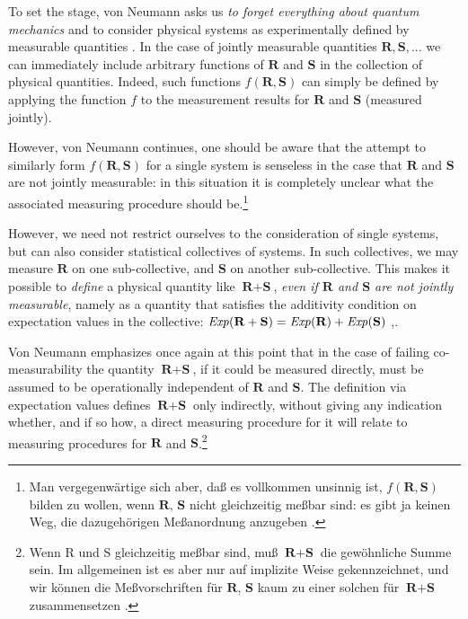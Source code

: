 \documentclass[12pt]{article}
\begin{document}
To set the stage, von Neumann asks us \emph{to forget everything about quantum mechanics} and to consider physical systems as experimentally defined by measurable quantities \cite[p.\@ 158]{VN1}. In the case of jointly measurable quantities $ \textbf{R}, \textbf{S},...$ we can immediately include arbitrary functions of $\textbf{R}$ and $\textbf{S}$ in the collection of physical quantities. Indeed, such functions $f(\textbf{R},\textbf{S})$ can simply be defined by applying the function $f$ to the measurement results for $\textbf{R}$ and $\textbf{S}$ (measured jointly).

However, von Neumann continues, one should be aware that the attempt to similarly form $f(\textbf{R},\textbf{S})$ for a single system is senseless in the case that $\textbf{R}$ and $\textbf{S}$ are not jointly measurable: in this situation it is completely unclear what the associated measuring procedure should be.\footnote{Man vergegenw\"{a}rtige sich aber, da{\ss} es vollkommen unsinnig ist, $f(\textbf{R},\textbf{S})$ bilden zu wollen, wenn $\textbf{R}$, $\textbf{S}$ nicht gleichzeitig me{\ss}bar sind: es gibt ja keinen Weg, die dazugeh\"{o}rigen Me{\ss}anordnung anzugeben \cite[p.\@ 158]{VN1}.}

However, we need not restrict ourselves to the consideration of single systems, but can also consider statistical collectives of systems. In such collectives, we may measure $\textbf{R}$ on one sub-collective, and $\textbf{S}$ on another sub-collective. This makes it possible to \emph{define} a physical quantity like $\textbf{R} + \textbf{S}$, \emph{even if $\textbf{R}$ and $\textbf{S}$ are not jointly measurable}, namely as a quantity that satisfies the additivity condition on expectation values in the collective: ${\it Exp}(\textbf{R}+\textbf{S}) = {\it Exp}(\textbf{R}) + {\it Exp}(\textbf{S})$ \cite[p.\@ 164]{VN1},\cite{bub}.

Von Neumann emphasizes once again at this point that in the case of failing co-measurability the quantity $\textbf{R}+\textbf{S}$, if it could be measured directly, must be assumed to be operationally independent of $\textbf{R}$ and $\textbf{S}$. The definition via expectation values defines $\textbf{R} + \textbf{S}$ only indirectly, without giving any indication whether, and if so how, a direct measuring procedure for it will relate to measuring procedures for $\textbf{R}$ and $\textbf{S}$.\footnote{Wenn R und S gleichzeitig me{\ss}bar sind, mu{\ss} $\textbf{R} + \textbf{S}$ die gew\"{o}hnliche Summe sein. Im allgemeinen ist es aber nur auf implizite Weise gekennzeichnet, und wir k\"{o}nnen die Me{\ss}vorschriften f\"{u}r $\textbf{R}$, $\textbf{S}$ kaum zu einer solchen f\"{u}r $\textbf{R} + \textbf{S}$ zusammensetzen \cite[p.\@ 164]{VN1}.}
\end{document}
